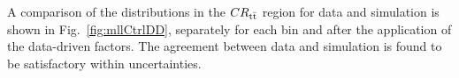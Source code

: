 A comparison of the \mll distributions in the $CR_{\mathrm{t}\bar{\mathrm{t}}}$ region for data and simulation is shown in Fig.~\ref{fig:mllCtrlDD}, separately for each \pth bin and after the application of the data-driven factors. The agreement between data and simulation is found to be satisfactory within uncertainties.

\begin{figure}[htb]
\centering
{}
\\

\end{figure}
